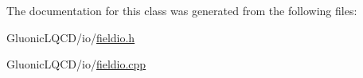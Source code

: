The documentation for this class was generated from the following files\+:\begin{DoxyCompactItemize}
\item 
Gluonic\+L\+Q\+C\+D/io/\mbox{\hyperlink{fieldio_8h}{fieldio.\+h}}\item 
Gluonic\+L\+Q\+C\+D/io/\mbox{\hyperlink{fieldio_8cpp}{fieldio.\+cpp}}\end{DoxyCompactItemize}
